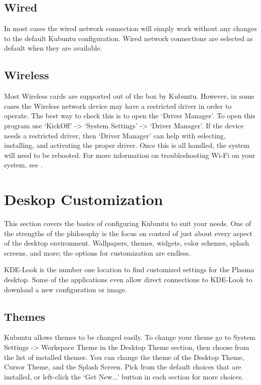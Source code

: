 \documentclass[letterpaper,10pt,english]{sphinxmanual}
\begin{document}
\subsection{Wired}
\label{\detokenize{docs/basic:wired}}
In most cases the wired network connection will simply work without any changes to the default Kubuntu configuration. Wired network connections are selected as default when they are available.


\subsection{Wireless}
\label{\detokenize{docs/basic:wireless}}
Most Wireless cards are supported out of the box by Kubuntu. However, in some cases the Wireless network device may have a restricted driver in order to operate. The best way to check this is to open the `Driver Manager'. To open this program use `KickOff' -\textgreater{} `System Settings' -\textgreater{} `Driver Manager'. If the device needs a restricted driver, then `Driver Manager' can help with selecting, installing, and activating the proper driver. Once this is all handled, the system will need to be rebooted. For more information on troubleshooting Wi-Fi on your system, see .


\section{Deskop Customization}
\label{\detokenize{docs/basic:deskop-customization}}
This section covers the basics of configuring Kubuntu to suit your needs. One of the strengths of the  philosophy is the focus on control of just about every aspect of the desktop environment. Wallpapers, themes, widgets, color schemes, splash screens, and more; the options for customization are endless.

KDE-Look is the number one location to find customized settings for the  Plasma desktop. Some of the applications even allow direct connections to KDE-Look to download a new configuration or image.


\subsection{Themes}
\label{\detokenize{docs/basic:themes}}
Kubuntu allows themes to be changed easily. To change your theme go to System Settings -\textgreater{} Workspace Theme in the Desktop Theme section, then choose from the list of installed themes. You can change the theme of the Desktop Theme, Cursor Theme, and the Splash Screen. Pick from the default choices that are installed, or left-click the `Get New...' button in each section for more choices.
\end{document}

